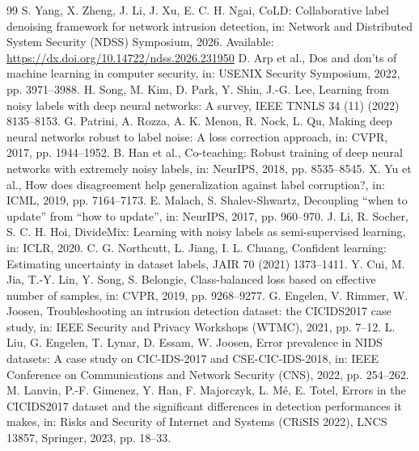 \documentclass[pdflatex,referee,lineno,sn-basic,Numbered]{sn-jnl}
\begin{document}
\begin{thebibliography}{99}
 S. Yang, X. Zheng, J. Li, J. Xu, E. C. H. Ngai,
CoLD: Collaborative label denoising framework for network intrusion detection,
in: Network and Distributed System Security (NDSS) Symposium, 2026.
Available: \url{https://dx.doi.org/10.14722/ndss.2026.231950}
 D. Arp et al., Dos and don'ts of machine learning in
computer security, in: USENIX Security Symposium, 2022, pp. 3971--3988.
 H. Song, M. Kim, D. Park, Y. Shin, J.-G. Lee,
Learning from noisy labels with deep neural networks: A survey,
IEEE TNNLS 34 (11) (2022) 8135--8153.
 G. Patrini, A. Rozza, A. K. Menon, R. Nock, L. Qu,
Making deep neural networks robust to label noise: A loss correction approach,
in: CVPR, 2017, pp. 1944--1952.
 B. Han et al., Co-teaching: Robust training of deep
neural networks with extremely noisy labels, in: NeurIPS, 2018, pp. 8535--8545.
 X. Yu et al., How does disagreement help
generalization against label corruption?, in: ICML, 2019, pp. 7164--7173.
 E. Malach, S. Shalev-Shwartz, Decoupling ``when to
update'' from ``how to update'', in: NeurIPS, 2017, pp. 960--970.
 J. Li, R. Socher, S. C. H. Hoi, DivideMix: Learning with
noisy labels as semi-supervised learning, in: ICLR, 2020.
 C. G. Northcutt, L. Jiang, I. L. Chuang,
Confident learning: Estimating uncertainty in dataset labels,
JAIR 70 (2021) 1373--1411.
 Y. Cui, M. Jia, T.-Y. Lin, Y. Song, S. Belongie,
Class-balanced loss based on effective number of samples, in: CVPR, 2019,
pp. 9268--9277.
 G. Engelen, V. Rimmer, W. Joosen,
Troubleshooting an intrusion detection dataset: the CICIDS2017 case study,
in: IEEE Security and Privacy Workshops (WTMC), 2021, pp. 7--12.
 L. Liu, G. Engelen, T. Lynar, D. Essam, W. Joosen,
Error prevalence in NIDS datasets: A case study on CIC-IDS-2017 and
CSE-CIC-IDS-2018, in: IEEE Conference on Communications and Network Security
(CNS), 2022, pp. 254--262.
 M. Lanvin, P.-F. Gimenez, Y. Han, F. Majorczyk,
L. M\'e, E. Totel, Errors in the CICIDS2017 dataset and the significant
differences in detection performances it makes, in: Risks and Security of
Internet and Systems (CRiSIS 2022), LNCS 13857, Springer, 2023, pp. 18--33.

\end{thebibliography}
\end{document}
